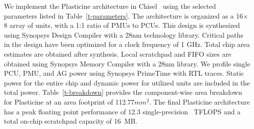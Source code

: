 
We implement the Plasticine architecture in Chisel~\cite{chisel} using the selected parameters listed in Table~\ref{t-parameters}.
The architecture is organized as a 16$\times$8 array of units, with a 1:1 ratio of PMUs to PCUs.
This design is synthesized using Synopsys Design Compiler with a 28nm technology library.
Critical paths in the design have been optimized for a clock frequency of 1 GHz.
Total chip area estimates are obtained after synthesis. Local scratchpad and FIFO sizes are obtained using
Synopsys Memory Compiler with a 28nm library. We profile single PCU, PMU, and AG power using Synopsys
PrimeTime with RTL traces. Static power for the entire chip and dynamic power for utilized units are
included in the total power.
Table~\ref{t-breakdown} provides the component-wise area breakdown for Plasticine at an area footprint of 112.77$mm^2$. The final Plasticine architecture has a peak floating point performance of 12.3 single-precision ~TFLOPS and a total on-chip scratchpad capacity of 16~MB.

